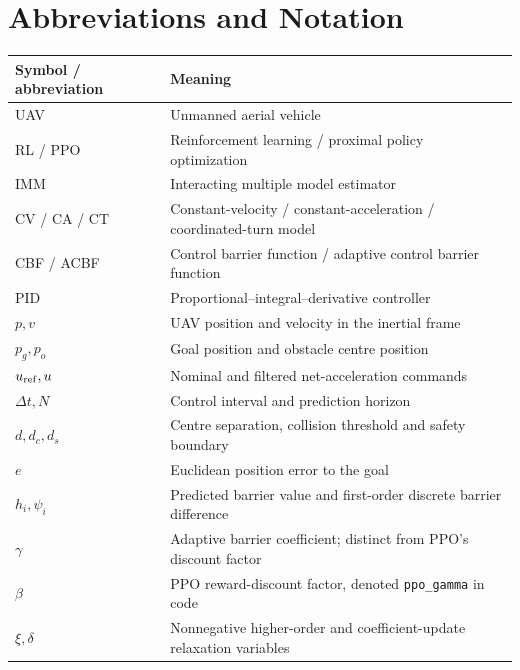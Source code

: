 \chapter*{Abbreviations and Notation}
\begin{tabularx}{\textwidth}{lY}
\toprule Symbol / abbreviation & Meaning\\\midrule
UAV & Unmanned aerial vehicle\\
RL / PPO & Reinforcement learning / proximal policy optimization\\
IMM & Interacting multiple model estimator\\
CV / CA / CT & Constant-velocity / constant-acceleration / coordinated-turn model\\
CBF / ACBF & Control barrier function / adaptive control barrier function\\
PID & Proportional--integral--derivative controller\\
$p,v$ & UAV position and velocity in the inertial frame\\
$p_g,p_o$ & Goal position and obstacle centre position\\
$u_{\rm ref},u$ & Nominal and filtered net-acceleration commands\\
$\Delta t,N$ & Control interval and prediction horizon\\
$d,d_c,d_s$ & Centre separation, collision threshold and safety boundary\\
$e$ & Euclidean position error to the goal\\
$h_i,\psi_i$ & Predicted barrier value and first-order discrete barrier difference\\
$\gamma$ & Adaptive barrier coefficient; distinct from PPO's discount factor\\
$\beta$ & PPO reward-discount factor, denoted \texttt{ppo\_gamma} in code\\
$\xi,\delta$ & Nonnegative higher-order and coefficient-update relaxation variables\\
\bottomrule
\end{tabularx}
